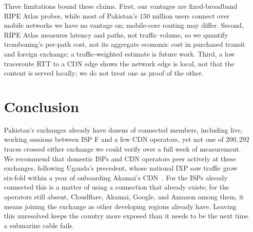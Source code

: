 \documentclass[sigconf,anonymous,10pt]{acmart}
\begin{document}
Three limitations bound these claims. First, our vantages are fixed-broadband RIPE Atlas probes, while most of Pakistan's $150$ million users connect over mobile networks we have no vantage on; mobile-core routing may differ.
Second, RIPE Atlas measures latency and paths, not traffic volume, so we quantify tromboning's per-path cost, not its aggregate economic cost in purchased transit and foreign exchange; a traffic-weighted estimate is future work. Third, a low traceroute RTT to a CDN edge shows the network edge is local, not that the content is served locally; we do not treat one as proof of the other. 

\section{Conclusion}
Pakistan's exchanges already have dozens of connected members, including live, working sessions between ISP F and a few CDN operators, yet not one of $200,292$ traces crossed either exchange we could verify over a full week of measurement. We recommend that domestic ISPs and CDN operators peer actively at these exchanges, following Uganda's precedent, whose national IXP saw traffic grow six-fold within a year of onboarding Akamai's CDN~\cite{obriain2017rebuilding}. For the ISPs already connected this is a matter of using a connection that already exists; for the operators still absent, Cloudflare, Akamai, Google, and Amazon among them, it means joining the exchange as other developing regions already have. Leaving this unresolved keeps the country more exposed than it needs to be the next time a submarine cable fails.


\end{document}
